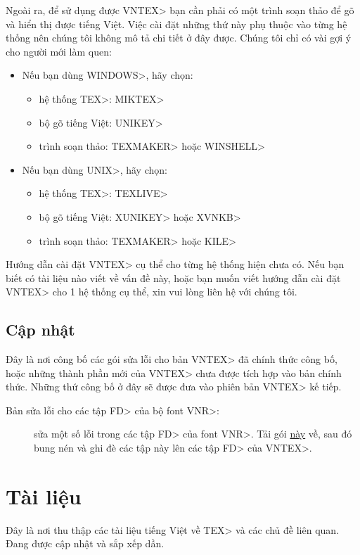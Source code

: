 \documentclass[12pt,a4paper]{article}
\begin{document}
Ngoài ra, để sử dụng được \<VNTEX> bạn cần phải có một trình soạn thảo để
gõ và hiển thị được tiếng Việt. Việc cài đặt những thứ này phụ thuộc vào
từng hệ thống nên chúng tôi không mô tả chi tiết ở đây được. Chúng tôi chỉ
có vài gợi ý cho người mới làm quen:
\begin{itemize}
\item Nếu bạn dùng \<WINDOWS>, hãy chọn:
\begin{itemize}
\item hệ thống \<TEX>: \<MIKTEX>
\item bộ gõ tiếng Việt: \<UNIKEY>
\item trình soạn thảo: \<TEXMAKER> hoặc \<WINSHELL>
\end{itemize}

\item Nếu bạn dùng \<UNIX>, hãy chọn:
\begin{itemize}
\item hệ thống \<TEX>: \<TEXLIVE>
\item bộ gõ tiếng Việt: \<XUNIKEY>  hoặc \<XVNKB>
\item trình soạn thảo: \<TEXMAKER> hoặc \<KILE>
\end{itemize}
\end{itemize}

Hướng dẫn cài đặt \<VNTEX> cụ thể cho từng hệ thống hiện chưa có. Nếu bạn
biết có tài liệu nào viết về vấn đề này, hoặc bạn muốn viết hướng dẫn cài
đặt \<VNTEX> cho 1 hệ thống cụ thể, xin vui lòng liên hệ với chúng tôi.

\subsection{Cập nhật}
\hypertarget{cap-nhat}{}
Đây là nơi công bố các gói sửa lỗi cho bản \<VNTEX> đã chính thức công bố,
hoặc những thành phần mới của \<VNTEX> chưa được tích hợp vào bản chính
thức. Những thứ công bố ở đây sẽ được đưa vào phiên bản \<VNTEX> kế tiếp.

\begin{description}
\item[Bản sửa lỗi cho các tập \<FD> của bộ font \<VNR>:]
  \hypertarget{cap-nhat-vnr-fd}{} sửa một số lỗi trong các tập \<FD>
  của font \<VNR>. Tải gói
  \href{http://vntex.sf.net/download/vntex-updates/vntex-update-20060603.zip}{này}
  về, sau đó bung nén và ghi đè các tập này lên các tập \<FD> của
  \<VNTEX>.
\end{description}


\section{Tài liệu}
\hypertarget{tai-lieu}{}
Đây là nơi thu thập các tài liệu tiếng Việt về \<TEX> và các  chủ đề liên
quan. Đang được cập nhật và sắp xếp dần.
\end{document}
